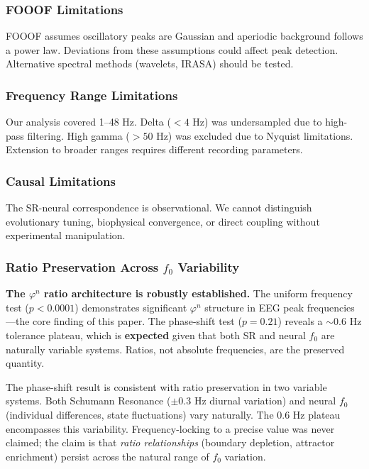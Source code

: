 \documentclass[11pt,a4paper]{article}
\newcommand{\phisym}{\varphi}
\newcommand{\fzero}{f_0}
\begin{document}
\subsubsection{FOOOF Limitations}

FOOOF assumes oscillatory peaks are Gaussian and aperiodic background follows a power law. Deviations from these assumptions could affect peak detection. Alternative spectral methods (wavelets, IRASA) should be tested.

\subsubsection{Frequency Range Limitations}

Our analysis covered 1--48 Hz. Delta ($<4$ Hz) was undersampled due to high-pass filtering. High gamma ($>50$ Hz) was excluded due to Nyquist limitations. Extension to broader ranges requires different recording parameters.

\subsubsection{Causal Limitations}

The SR-neural correspondence is observational. We cannot distinguish evolutionary tuning, biophysical convergence, or direct coupling without experimental manipulation.

\subsubsection{Ratio Preservation Across $\fzero$ Variability}

\textbf{The $\phisym^n$ ratio architecture is robustly established.} The uniform frequency test ($p < 0.0001$) demonstrates significant $\phisym^n$ structure in EEG peak frequencies---the core finding of this paper. The phase-shift test ($p = 0.21$) reveals a $\sim$0.6 Hz tolerance plateau, which is \textbf{expected} given that both SR and neural $\fzero$ are naturally variable systems. Ratios, not absolute frequencies, are the preserved quantity.

The phase-shift result is consistent with ratio preservation in two variable systems. Both Schumann Resonance ($\pm 0.3$ Hz diurnal variation) and neural $\fzero$ (individual differences, state fluctuations) vary naturally. The 0.6 Hz plateau encompasses this variability. Frequency-locking to a precise value was never claimed; the claim is that \textit{ratio relationships} (boundary depletion, attractor enrichment) persist across the natural range of $\fzero$ variation.
\end{document}
